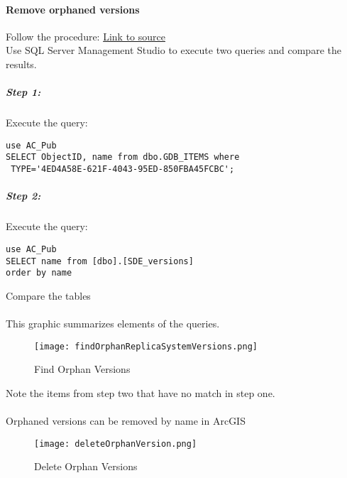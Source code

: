 \documentclass[class=article , crop=false, titlepage, twoside, multi={itemize, figure, verbatim}, float=false]{standalone}
\begin{document}
\paragraph[Remove orphaned versions]{Remove orphaned versions \texorpdfstring{\\}{}}
Follow the procedure:
\href{https://support.esri.com/en/technical-article/000010858}{Link to source}\\
Use SQL Server Management Studio to execute two queries and compare the results.
\subparagraph*{Step 1: \texorpdfstring{\\}{}}
Execute the query:
\begin{verbatim}
use AC_Pub
SELECT ObjectID, name from dbo.GDB_ITEMS where
 TYPE='4ED4A58E-621F-4043-95ED-850FBA45FCBC';
\end{verbatim}
\subparagraph*{Step 2: \texorpdfstring{\\}{}}
Execute the query:
\begin{verbatim}
use AC_Pub
SELECT name from [dbo].[SDE_versions]
order by name

\end{verbatim}
\clearpage
Compare the tables
\paragraph*{}This graphic summarizes elements of the queries.
\begin{figure}[h!]
\centering
    \texttt{[image: findOrphanReplicaSystemVersions.png]}
\caption{Find Orphan Versions}
\end{figure}
Note the items from step two that have no match in step one.
\clearpage

\paragraph*{}Orphaned versions can be removed by name in ArcGIS
\begin{figure}[h!]
\centering
    \texttt{[image: deleteOrphanVersion.png]}
\caption{Delete Orphan Versions}
\end{figure}
\clearpage
\end{document}
